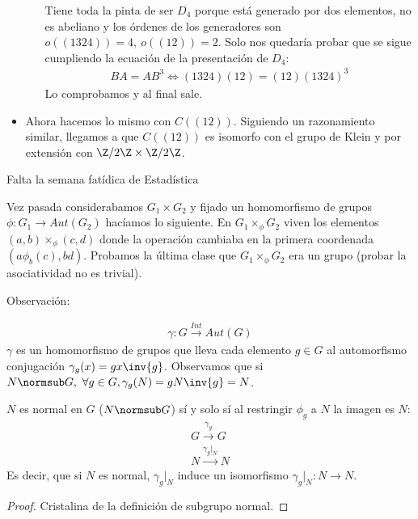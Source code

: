 \begin{ej}
\begin{itemize}
\begin{itemize}
			Tiene toda la pinta de ser $D_4$ porque está generado por dos elementos, no es abeliano y los órdenes de los generadores son $o((1324)) = 4,\ o((12)) = 2$. Solo nos quedaría probar que se sigue cumpliendo la ecuación de la presentación de $D_4$:
			\begin{align*}
			BA = AB^3 \iff (1324)(12) = (12)(1324)^3
			\end{align*}
			Lo comprobamos y al final sale.
		\end{itemize}
		
		\item Ahora hacemos lo mismo con $C((12))$. Siguiendo un razonamiento similar, llegamos a que $C((12))$ es isomorfo con el grupo de Klein y por extensión con $\Z/2\Z \times \Z/2\Z$.
	\end{itemize}
\end{ej}

Falta la semana fatídica de Estadística

Vez pasada considerabamos $G_1 \times G_2$ y fijado un homomorfismo de grupos $\phi: G_1 \to Aut(G_2)$ hacíamos lo siguiente. En $G_1 \times_{\phi} G_2$ viven los elementos $(a,b) \times_{\phi} (c,d)$ donde la operación cambiaba en la primera coordenada $(a \phi_b(c), bd)$. Probamos la última clase que $G_1 \times_{\phi} G_2$ era un grupo (probar la asociatividad no es trivial).


Observación:

\begin{align*}
\gamma: G \xrightarrow{Int} Aut(G)
\end{align*}
$\gamma$ es un homomorfismo de grupos que lleva cada elemento $g \in G$ al automorfismo conjugación $\gamma_g(x) = gx\inv{g}$. Observamos que si $N \normsub G,\ \forall g \in G, \gamma_g(N) = gN\inv{g} = N$.

\begin{pro}
	$N$ es normal en $G$ ($N \normsub G$) sí y solo sí al restringir $\phi_g$ a $N$ la imagen es $N$:
	\begin{align*}
	G \xrightarrow{\gamma_g} G \\
	N \xrightarrow{\gamma_g \vert_N} N
	\end{align*}
	Es decir, que si $N$ es normal, $\gamma_g\vert_N$ induce un isomorfismo $\gamma_g\vert_N : N \to N$.
\end{pro}

\begin{proof}
	Cristalina de la definición de subgrupo normal.
\end{proof}

